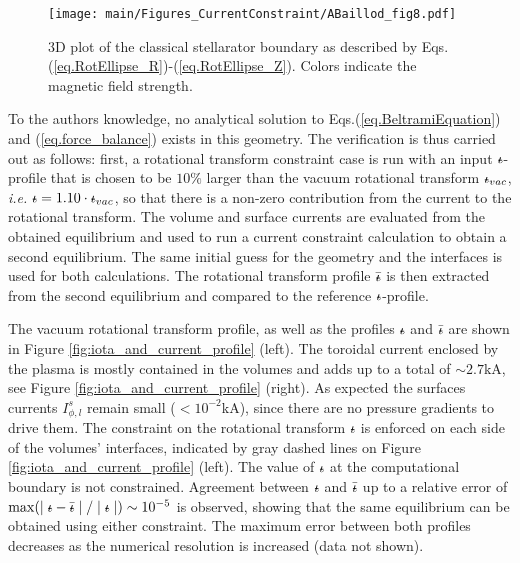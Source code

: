  \begin{figure}
     \centering
     \texttt{[image: main/Figures\_CurrentConstraint/ABaillod\_fig8.pdf]}
     \caption{\ac{3D} plot of the classical stellarator boundary as described by Eqs.(\ref{eq.RotEllipse_R})-(\ref{eq.RotEllipse_Z}). Colors indicate the magnetic field strength.}
     \label{fig:3Dplot}
 \end{figure}
  
 To the authors knowledge, no analytical solution to Eqs.(\ref{eq.BeltramiEquation}) and (\ref{eq.force_balance}) exists in this geometry. The verification is thus carried out as follows: first, a rotational transform constraint case is run with an input $\text{$\iota\!\!$-}$-profile that is chosen to be $10\%$ larger than the vacuum rotational transform $\text{$\iota\!\!$-}_{vac}$, \textit{i.e.} $\text{$\iota\!\!$-} = 1.10\cdot\text{$\iota\!\!$-}_{vac}$, so that there is a non-zero contribution from the current to the rotational transform. The volume and surface currents are evaluated from the obtained equilibrium and used to run a current constraint calculation to obtain a second equilibrium. The same initial guess for the geometry and the interfaces is used for both calculations. The rotational transform profile $\bar{\text{$\iota\!\!$-}}$ is then extracted from the second equilibrium and compared to the reference $\text{$\iota\!\!$-}$-profile.
 
 The vacuum rotational transform profile, as well as the profiles $\text{$\iota\!\!$-}$ and $\bar{\text{$\iota\!\!$-}}$ are shown in Figure \ref{fig:iota_and_current_profile} (left). The toroidal current enclosed by the plasma is mostly contained in the volumes and adds up to a total of $\sim 2.7$kA, see Figure \ref{fig:iota_and_current_profile} (right). As expected the surfaces currents $I^s_{\phi,l}$ remain small ($<10^{-2}$kA), since there are no pressure gradients to drive them. The constraint on the rotational transform $\text{$\iota\!\!$-}$ is enforced on each side of the volumes' interfaces, indicated by gray dashed lines on Figure \ref{fig:iota_and_current_profile} (left). The value of $\text{$\iota\!\!$-}$ at the computational boundary is not constrained. Agreement between $\text{$\iota\!\!$-}$ and $\bar{\text{$\iota\!\!$-}}$ up to a relative error of $\max(\mid\text{$\iota\!\!$-}-\bar{\text{$\iota\!\!$-}}\mid / \mid\text{$\iota\!\!$-}\mid)\sim 10^{-5}$ is observed, showing that the same equilibrium can be obtained using either constraint. The maximum error between both profiles decreases as the numerical resolution is increased (data not shown).

